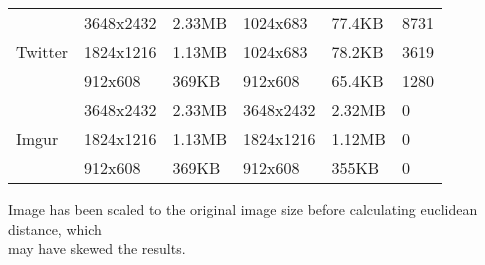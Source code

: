 \begin{table}[]
\begin{tabular}{@{}llllll@{}}
		\multirow{3}{*}{Twitter}                                & 3648x2432                                                  & 2.33MB                                               & 1024x683                                                   & 77.4KB                                               & 8731\textsuperscript{\textdagger}                            \\
																& 1824x1216                                                  & 1.13MB                                               & 1024x683                                                   & 78.2KB                                               & 3619\textsuperscript{\textdagger}                            \\
																& 912x608                                                    & 369KB                                                & 912x608                                                    & 65.4KB                                               & 1280                                                         \\ \midrule
		\multirow{3}{*}{Imgur}                                  & 3648x2432                                                  & 2.33MB                                               & 3648x2432                                                  & 2.32MB                                               & 0                                                            \\
																& 1824x1216                                                  & 1.13MB                                               & 1824x1216                                                  & 1.12MB                                               & 0                                                            \\
																& 912x608                                                    & 369KB                                                & 912x608                                                    & 355KB                                                & 0                                                            \\ \bottomrule
	\end{tabular}
	\begin{tablenotes}
		\footnotesize{\item \textdagger Image has been scaled to the original image size before calculating euclidean distance, which\\ may have skewed the results.}
	\end{tablenotes}
\end{table}
\vspace{12pt}

